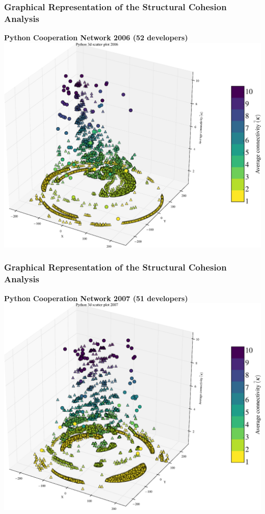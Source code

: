 \documentclass[ignorenonframetext,red,8pt,notes=hide]{beamer}
\begin{document}
\begin{frame}
\frametitle{Graphical Representation of the Structural Cohesion Analysis}

\begin{center}
\textbf{Python Cooperation Network 2006 (52 developers)}
\includegraphics[scale=0.25]{img/3d_scatter_python_2006}
\end{center}

\end{frame}

\begin{frame}
\frametitle{Graphical Representation of the Structural Cohesion Analysis}

\begin{center}
\textbf{Python Cooperation Network 2007 (51 developers)}
\includegraphics[scale=0.25]{img/3d_scatter_python_2007}
\end{center}

\end{frame}
\end{document}
